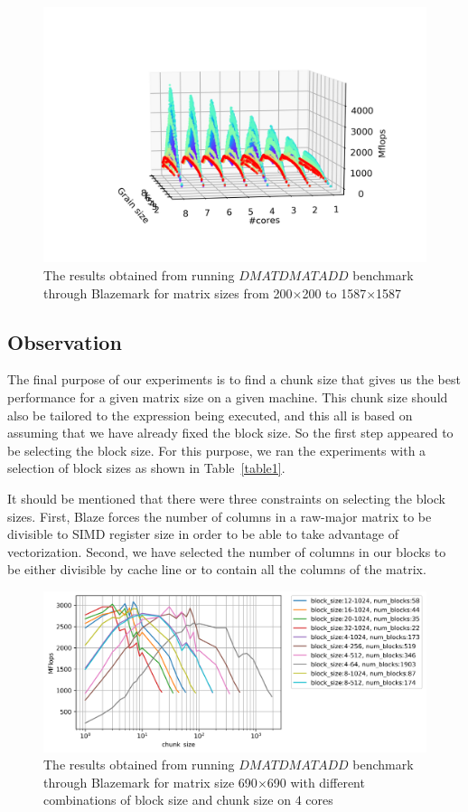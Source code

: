 \begin{figure}[H]
	\centering
	\includegraphics[width=1\linewidth]{images/fig4.png}
	\caption{The results obtained from running $DMATDMATADD$ benchmark through Blazemark for matrix sizes from 200$\times$200 to 1587$\times$1587}	
	\label{fig4}
\end{figure}

\vspace{\baselineskip}	
\subsection{Observation}
The final purpose of our experiments is to find a chunk size that gives us the best performance for a given matrix size on a given machine. This chunk size should also be tailored to the expression being executed, and this all is based on assuming that we have already fixed the block size.
So the first step appeared to be selecting the block size. For this purpose, we ran the experiments with a selection of block sizes as shown in Table~\ref{table1}.


It should be mentioned that there were three constraints on selecting the block sizes. First, Blaze forces the number of columns in a raw-major matrix to be divisible to SIMD register size in order to be able to take advantage of vectorization. Second, we have selected the number of columns in our blocks to be either divisible by cache line or to contain all the columns of the matrix.     


\begin{figure}[H]
	\centering
	\includegraphics[width=1\linewidth]{images/fig5.png}
	\caption{The results obtained from running $DMATDMATADD$ benchmark through Blazemark for matrix size 690$\times$690 with different combinations of block size and chunk size on $4$ cores}	
	\label{fig5}
\end{figure}

